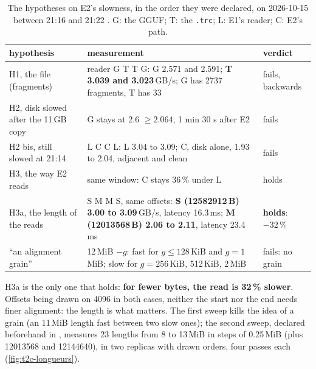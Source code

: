 \begin{table}[ht]
\centering\small
\caption[The hypotheses, killed or kept by the numbers]{The hypotheses on E2's slowness, in the order they were declared, on 2026-10-15 between 21:16 and 21:22 \mes. G: the GGUF; T: the \texttt{.trc}; L: E1's reader; C: E2's path.}
\label{tab:t2c-hypotheses}
\begin{tabularx}{\linewidth}{@{}p{3.6cm}Xp{2.2cm}@{}}
\toprule
hypothesis & measurement & verdict \\
\midrule
H1, the file (fragments) & reader G T T G: G 2.571 and 2.591; \textbf{T 3.039 and 3.023}\,GB/s; G has \num{2737} fragments, T has 33 & fails, backwards \\
H2, disk slowed after the 11\,GB copy & G stays at 2.6 $\ge 2.064$, 1 min 30 s after E2 & fails \\
H2 bis, still slowed at 21:14 & L C C L: L 3.04 to 3.09; C, disk alone, 1.93 to 2.04, adjacent and clean & fails \\
H3, the way E2 reads & same window: C stays 36\,\% under L & holds \\
H3a, the length of the reads & S M M S, same offsets: \textbf{S (\num{12582912}\,B) 3.00 to 3.09}\,GB/s, latency 16.3\,ms; \textbf{M (\num{12013568}\,B) 2.06 to 2.11}, latency 23.4\,ms & \textbf{holds}: $-32\,\%$ \\
``an alignment grain'' & 12\,MiB $- g$: fast for $g \le 128$\,KiB and $g = 1$\,MiB; slow for $g = 256$\,KiB, 512\,KiB, 2\,MiB & fails: no grain \\
\bottomrule
\end{tabularx}
\end{table}

H3a is the only one that holds: \textbf{for fewer bytes, the read is 32\,\% slower}. Offsets being drawn on \num{4096} in both cases, neither the start nor the end needs finer alignment: the length is what matters. The first sweep kills the idea of a grain (an 11\,MiB length fast between two slow ones); the second sweep, declared beforehand in , measures 23 lengths from 8 to 13\,MiB in steps of 0.25\,MiB (plus \num{12013568} and \num{12144640}), in two replicas with drawn orders, four passes each (\cref{fig:t2c-longueurs}).

